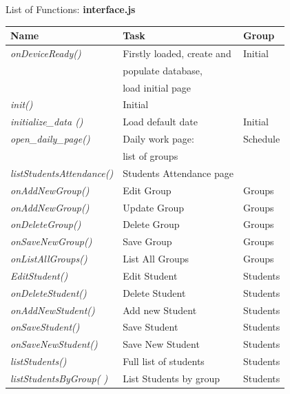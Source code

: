 \begin{bclogo}[couleur=orange!30,logo=\bcbook, arrondi=0.1,ombre=true ] 
{List of Functions: {\bf interface.js}}	
\begin{tabular}{lll}
Name                    & Task            & Group \\
\hline
\emph{ onDeviceReady()  }&  Firstly loaded, create and    &  Initial\\
&populate database,              &                          \\
&load initial page               &                          \\
\emph{ init()  } &Initial                         &   \\
\emph{ initialize\_data ()      } &Load default date               &    Initial \\
\emph{ open\_daily\_page()     } &Daily work page:                &   Schedule \\
& list of groups                  &                           \\
\emph{ listStudentsAttendance() }&Students Attendance page        &   \\
\emph{ onAddNewGroup()       }   &Edit Group                      &   Groups \\
\emph{ onAddNewGroup()       }   &Update Group                    &  Groups \\
\emph{ onDeleteGroup()       }   &Delete Group                    &   Groups \\    
\emph{ onSaveNewGroup()      }   &Save Group                      &   Groups \\
\emph{ onListAllGroups()     }   &List All Groups                 &  Groups \\
\emph{ EditStudent()         }   &Edit Student                    &   Students \\
\emph{ onDeleteStudent()     }   & Delete Student                  &  Students \\   
\emph{ onAddNewStudent()     }   &Add new Student                 &   Students \\    
\emph{ onSaveStudent()       }   &Save Student                    &  Students \\
\emph{ onSaveNewStudent()    }   & Save New Student                &   Students \\
\emph{ listStudents()        }   & Full list of students           &  Students \\
\emph{ listStudentsByGroup( )}   & List Students by group          &  Students \\

\end{tabular}
\end{bclogo}
